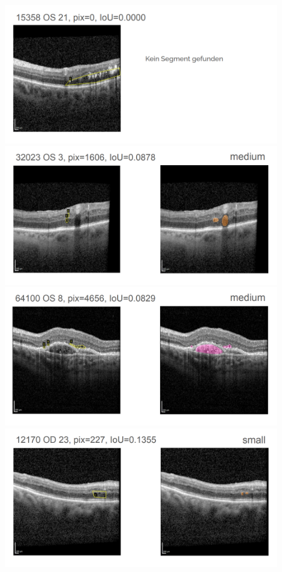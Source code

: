 \centering
\includegraphics[width=0.9\textwidth]{./pic/Segmentierung/Segmentierungsergebnisse/1.PNG}
\includegraphics[width=0.9\textwidth]{./pic/Segmentierung/Segmentierungsergebnisse/2.PNG}
\includegraphics[width=0.9\textwidth]{./pic/Segmentierung/Segmentierungsergebnisse/3.PNG}
\includegraphics[width=0.9\textwidth]{./pic/Segmentierung/Segmentierungsergebnisse/4.PNG}
